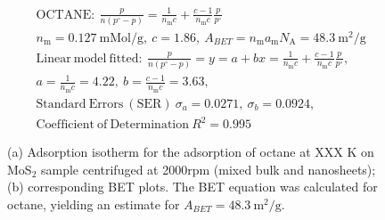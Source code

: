 

\begin{align*}
&\mathrm{OCTANE:}\ \frac{p}{n(p^\circ-p)}=\frac{1}{n_\mathrm{m}c}+\frac{c-1}{n_\mathrm{m}c}\frac{p}{p^\circ}\\
&{n_\mathrm{m}}=0.127\ \mathrm{mMol/g},\ c=1.86,\ A_{BET}={n_\mathrm{m}}{a_\mathrm{m}}{N_\mathrm{A}}=48.3\ \mathrm{m}^2\mathrm{/g}\\
&\mathrm{Linear\ model\ fitted:}\ \frac{p}{n(p^\circ-p)}=y=a+bx=\frac{1}{n_\mathrm{m}c}+\frac{c-1}{n_\mathrm{m}c}\frac{p}{p^\circ},\\
&a=\frac{1}{n_\mathrm{m}c}=4.22,\ b=\frac{c-1}{n_\mathrm{m}c}=3.63,\\
&\mathrm{Standard\ Errors\ (SER)}\ \sigma_a=0.0271,\ \sigma_b=0.0924,\\
&\mathrm{Coefficient\ of\ Determination}\ R^2 = 0.995
\end{align*}


\begin{figure}[htb]
\hfill
{}
\caption{(a) Adsorption isotherm for the adsorption of octane at XXX K on MoS$_2$ 
sample centrifuged at 2000rpm (mixed bulk and nanosheets);
(b) corresponding BET plots. The BET equation was calculated for octane, yielding an estimate for $A_{BET}=48.3\ \mathrm{m}^2\mathrm{/g}$.}

\label{fig:sa-Nanosheets-Prep-I-1500rpm-10mg-01-3mm-30C-S1-SA-10ml-run2}
\end{figure}


